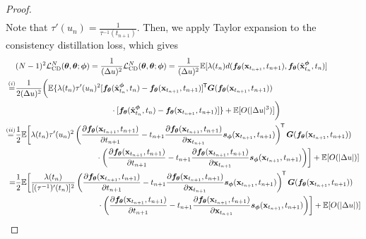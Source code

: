 \begin{appendices}
\begin{proof}
\begin{align}
    \end{align}
    Note that $\tau'(u_{n}) = \frac{1}{\tau^{-1}(t_{n+1})}$. Then, we apply Taylor expansion to the consistency distillation loss, which gives
    \begin{align}
        &(N-1)^2 \mcal{L}_\text{CD}^N(\vtheta, \vtheta; \vphi) = \frac{1}{(\Delta u)^2}\mcal{L}_\text{CD}^N(\vtheta, \vtheta; \vphi) = \frac{1}{(\Delta u)^2} \mbb{E}[\lambda(t_n)d(\vf_\vtheta(\rvx_{t_{n+1}}, t_{n+1}), \vf_{\vtheta}(\hat{\rvx}_{t_n}^\vphi, t_n)]\notag \\
        \stackrel{(i)}{=}&\begin{multlined}[t][0.9\displaywidth]
            \frac{1}{2 (\Delta u)^2}\bigg(\mbb{E}\{\lambda(t_n)\tau'(u_{n})^2 [\vf_\vtheta(\hat{\rvx}_{t_n}^\vphi, t_n) - \vf_\vtheta(\rvx_{t_{n+1}}, t_{n+1})]\tran \mG(\vf_\vtheta(\rvx_{t_{n+1}}, t_{n+1}))\\ \cdot [\vf_\vtheta(\hat{\rvx}_{t_n}^\vphi, t_n) - \vf_\vtheta(\rvx_{t_{n+1}}, t_{n+1})]\} + \mbb{E}[O(|\Delta u|^3)]\bigg)
        \end{multlined}\notag \\
        \stackrel{(ii)}{=}&\!\begin{multlined}[t][0.9\displaywidth]
            \frac{1}{2}\mbb{E}\bigg[\lambda(t_n) \tau'(u_{n})^2 \left(\frac{\partial \vf_\vtheta(\rvx_{t_{n+1}}, t_{n+1})}{\partial t_{n+1}} - t_{n+1} \frac{\partial \vf_\vtheta(\rvx_{t_{n+1}}, t_{n+1})}{\partial \rvx_{t_{n+1}}} \vs_\vphi(\rvx_{t_{n+1}}, t_{n+1})\right)\tran \mG(\vf_\vtheta(\rvx_{t_{n+1}}, t_{n+1})) \\
            \cdot \bigg(\frac{\partial \vf_\vtheta(\rvx_{t_{n+1}}, t_{n+1})}{\partial t_{n+1}} - t_{n+1} \frac{\partial \vf_\vtheta(\rvx_{t_{n+1}}, t_{n+1})}{\partial \rvx_{t_{n+1}}} \vs_\vphi(\rvx_{t_{n+1}}, t_{n+1})\bigg)\bigg] + \mbb{E}[O(|\Delta u|)]
        \end{multlined}\notag \\
        =&\!\begin{multlined}[t][0.9\displaywidth]
                \frac{1}{2}\mbb{E}\bigg[\frac{\lambda(t_n)}{[(\tau^{-1})'(t_{n})]^2} \left(\frac{\partial \vf_\vtheta(\rvx_{t_{n+1}}, t_{n+1})}{\partial t_{n+1}} - t_{n+1} \frac{\partial \vf_\vtheta(\rvx_{t_{n+1}}, t_{n+1})}{\partial \rvx_{t_{n+1}}} \vs_\vphi(\rvx_{t_{n+1}}, t_{n+1})\right)\tran \mG(\vf_\vtheta(\rvx_{t_{n+1}}, t_{n+1})) \\
                \cdot \bigg(\frac{\partial \vf_\vtheta(\rvx_{t_{n+1}}, t_{n+1})}{\partial t_{n+1}} - t_{n+1} \frac{\partial \vf_\vtheta(\rvx_{t_{n+1}}, t_{n+1})}{\partial \rvx_{t_{n+1}}} \vs_\vphi(\rvx_{t_{n+1}}, t_{n+1})\bigg)\bigg] + \mbb{E}[O(|\Delta u|)] \label{eq:ctcd2}

\end{multlined}
\end{align}
\end{proof}
\end{appendices}
